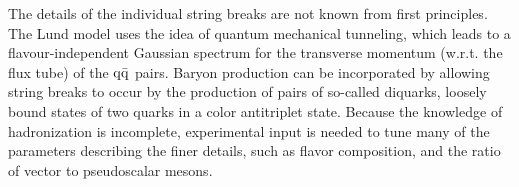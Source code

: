 The details of the individual string breaks are not known from first principles. The Lund model
uses the idea of quantum mechanical tunneling, which leads to a flavour-independent
Gaussian spectrum for the transverse momentum (w.r.t. the flux tube) of the $\mathrm{q} \bar{\mathrm{q}}$ pairs.
Baryon production can be incorporated by allowing string breaks to occur by the production of
pairs of so-called diquarks, loosely bound states of two quarks in a color antitriplet state. 
Because the knowledge of hadronization is incomplete, experimental input is needed to tune many of
the parameters describing the finer details, such as flavor composition, and the ratio of vector to
pseudoscalar mesons. 
